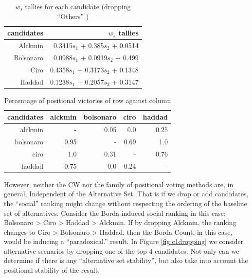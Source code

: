 \documentclass[hidelinks,11pt]{article}
\begin{document}
\begin{table}[]
  \centering
\begin{tabular}{|r|r|}
\hline
\textbf{candidates} & \textbf{\(w_s\) tallies}               \\ \hline
Alckmin             & 0.3415\(s_1\) + 0.385\(s_2\) + 0.0514  \\ \hline
Bolsonaro           & 0.0988\(s_1\) + 0.0919\(s_2\) + 0.499  \\ \hline
Ciro                & 0.4358\(s_1\) + 0.3173\(s_2\) + 0.1348 \\ \hline
Haddad              & 0.1238\(s_1\) + 0.2057\(s_2\) + 0.3147 \\ \hline
\end{tabular}
\caption{\(w_{s}\) tallies for each candidate (dropping ``Others'' )}
\end{table}


\begin{table}[]
  \centering
\begin{tabular}{|r|r|r|r|r|}
\hline
\textbf{candidates} & \textbf{alckmin} & \textbf{bolsonaro} & \textbf{ciro} & \textbf{haddad} \\ \hline
alckmin             & -             & 0.05               & 0.0           & 0.25            \\ \hline
bolsonaro           & 0.95             & -            & 0.69          & 1.0             \\ \hline
ciro                & 1.0              & 0.31               & -           & 0.76            \\ \hline
haddad              & 0.75             & 0.0                & 0.24          & -            \\ \hline
\end{tabular}
\caption{Percentage of positional victories of row against column}
\end{table}








However, neither the CW nor the family of positional voting methods are, in
general, Independent of the Alternative Set\parencite{kaminski2015empirical}.
That is if we drop or add candidates, the ``social'' ranking might change
without respecting the ordering of the baseline set of alternatives. Consider
the Borda-induced social ranking in this case: Bolsonaro > Ciro > Haddad >
Alckmin. If by dropping Alckmin, the ranking changes to Ciro > Bolsonaro >
Haddad, then the Borda Count, in this case, would be inducing a ``paradoxical.''
result. In Figure \ref{fig:c1dropping} we consider alternative scenarios by
dropping one of the top 4 candidates. Not only can we determine if there is any ``alternative set stability'', but also take into account the positional stability of the result.
\end{document}
